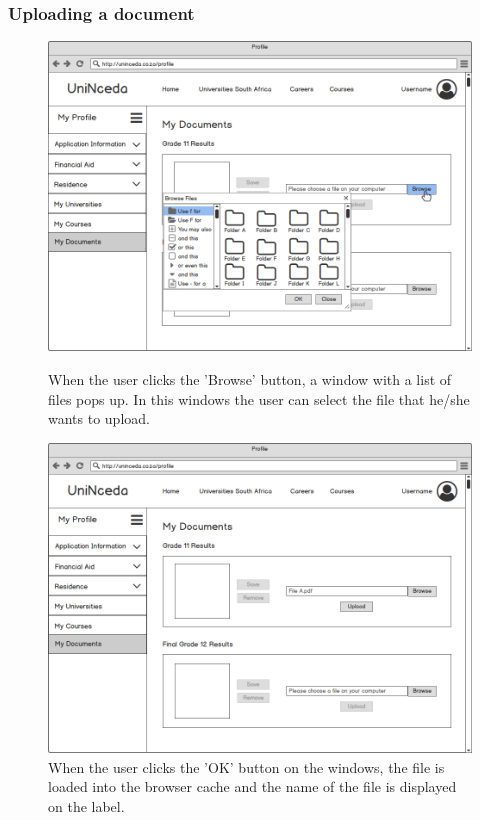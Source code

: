 \documentclass[a4paper, 12pt]{article}
\begin{document}
\subsubsection{Uploading a document}
\renewcommand{\figurename}{Step}
\setcounter{figure}{0}

\begin{figure}[H]
\centering
\includegraphics[scale=0.35]{ProfileMyDocumentsBrowse}
\caption{When the user clicks the 'Browse' button, a window with a list of files pops up. In this windows the user can select the file that he/she wants to upload.}
\label{ProfileMyDocumentsBrowse}


\vspace{1cm}

\includegraphics[scale=0.35]{ProfileMyDocumentsFileSelected}
\caption{When the user clicks the 'OK' button on the windows, the file is loaded into the browser cache and the name of the file is displayed on the label.}
\label{ProfileMyDocumentsFileSelected}


\end{figure}
\end{document}
